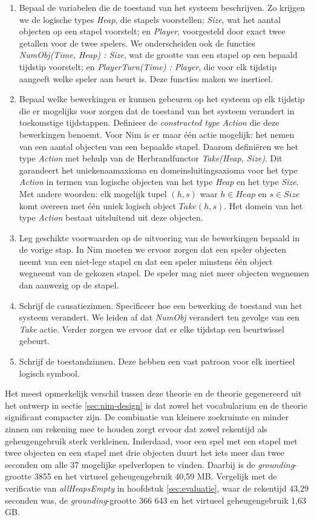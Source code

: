 \begin{enumerate}
	\item Bepaal de variabelen die de toestand van het systeem beschrijven. Zo krijgen we de logische types \textit{Heap}, die stapels voorstellen; \textit{Size}, wat het aantal objecten op een stapel voorstelt; en \textit{Player}, voorgesteld door exact twee getallen voor de twee spelers. We onderscheiden ook de functies \textit{NumObj(Time, Heap) : Size}, wat de grootte van een stapel op een bepaald tijdstip voorstelt; en \textit{PlayerTurn(Time) : Player}, die voor elk tijdstip aangeeft welke speler aan beurt is. Deze functies maken we inertieel.
	\item Bepaal welke bewerkingen er kunnen gebeuren op het systeem op elk tijdstip die er mogelijks voor zorgen dat de toestand van het systeem verandert in toekomstige tijdstappen. Definieer de \textit{constructed type Action} die deze bewerkingen benoemt. Voor Nim is er maar \'e\'en actie mogelijk: het nemen van een aantal objecten van een bepaalde stapel. Daarom defini\"eren we het type \textit{Action} met behulp van de Herbrandfunctor \textit{Take(Heap, Size)}. Dit garandeert het uniekenaamaxioma en domeinsluitingsaxioma voor het type \textit{Action} in termen van logische objecten van het type \textit{Heap} en het type \textit{Size}.\cite{DeCatBroes2014PLaa} Met andere woorden: elk mogelijk tupel $(h, s)$ waar $h \in Heap$ en $s \in Size$ komt overeen met \'e\'en uniek logisch object $Take(h, s)$. Het domein van het type \textit{Action} bestaat uitsluitend uit deze objecten.
	\item Leg geschikte voorwaarden op de uitvoering van de bewerkingen bepaald in de vorige stap. In Nim moeten we ervoor zorgen dat een speler objecten neemt van een niet-lege stapel en dat een speler minstens \'e\'en object wegneemt van de gekozen stapel. De speler mag niet meer objecten wegnemen dan aanwezig op de stapel.
	\item Schrijf de causatiezinnen. Specificeer hoe een bewerking de toestand van het systeem verandert. We leiden af dat \textit{NumObj} verandert ten gevolge van een \textit{Take} actie. Verder zorgen we ervoor dat er elke tijdstap een beurtwissel gebeurt.
	\item Schrijf de toestandzinnen. Deze hebben een vast patroon voor elk inertieel logisch symbool.
\end{enumerate}

Het meest opmerkelijk verschil tussen deze theorie en de theorie gegenereerd uit het ontwerp in sectie \ref{sec:nim-design} is dat zowel het vocabularium en de theorie significant compacter zijn. De combinatie van kleinere zoekruimte en minder zinnen om rekening mee te houden zorgt ervoor dat zowel rekentijd als geheugengebruik sterk verkleinen. Inderdaad, voor een spel met een stapel met twee objecten en een stapel met drie objecten duurt het iets meer dan twee seconden om alle 37 mogelijke spelverlopen te vinden. Daarbij is de \textit{grounding}-grootte 3855 en het virtueel geheugengebruik 40,59 MB. Vergelijk met de verificatie van \textit{allHeapsEmpty} in hoofdstuk \ref{sec:evaluatie}, waar de rekentijd 43,29 seconden was, de \textit{grounding}-grootte 366 643 en het virtueel geheugengebruik 1,63 GB.

